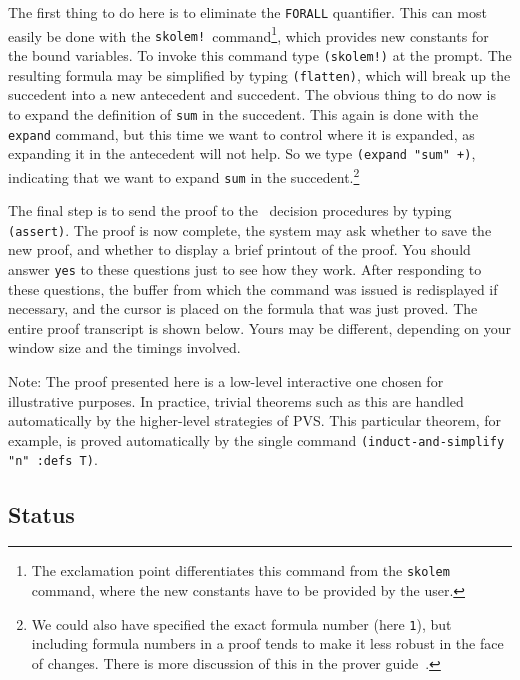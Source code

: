 The first thing to do here is to eliminate the {\tt FORALL} quantifier.
This can most easily be done with the {\tt skolem!}\
command\footnote{The exclamation point differentiates this command from
the {\tt skolem} command, where the new constants have to be provided by
the user.}, which provides new constants for the bound variables.  To
invoke this command type {\tt (skolem!)} at the prompt.  The resulting
formula may be simplified by typing {\tt (flatten)}, which will break up
the succedent into a new antecedent and succedent.  The obvious thing to
do now is to expand the definition of {\tt sum} in the succedent.  This
again is done with the {\tt expand} command, but this time we want to
control where it is expanded, as expanding it in the antecedent will not
help.  So we type {\tt (expand "sum" +)}, indicating that we want to
expand {\tt sum} in the succedent.\footnote{We could also have specified
the exact formula number (here {\tt 1}), but including formula numbers
in a proof tends to make it less robust in the face of changes.  There
is more discussion of this in the prover guide~\cite{PVS:prover}.}

The final step is to send the proof to the \pvs\ decision procedures
by typing {\tt (assert)}.  The proof is now complete, the system may
ask whether to save the new proof, and whether to display a brief
printout of the proof.  You should answer {\tt yes} to these questions
just to see how they work.  After responding to these questions, the
buffer from which the \cmd{prove} command was issued is redisplayed if
necessary, and the cursor is placed on the formula that was just
proved.  The entire proof transcript is shown below.  Yours may be
different, depending on your window size and the timings involved.

{\smaller\smaller\smaller\begin{alltt}

\end{alltt}}

Note: The proof presented here is a low-level interactive one chosen
for illustrative purposes.  In practice, trivial theorems such as this
are handled automatically by the higher-level strategies of PVS.  This
particular theorem, for example, is proved automatically by the single
command {\tt (induct-and-simplify "n" :defs T)}.


\subsection{Status}

